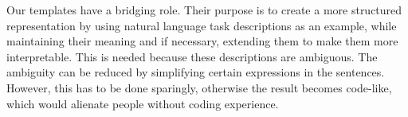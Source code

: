Our templates have a bridging role. Their purpose is to create a more structured
representation by using natural language task descriptions as an example, while
maintaining their meaning and if necessary, extending them to make them more
interpretable. This is needed because these descriptions are ambiguous. The
ambiguity can be reduced by simplifying certain expressions in the sentences.
However, this has to be done sparingly, otherwise the result becomes code-like,
which would alienate people without coding experience.
